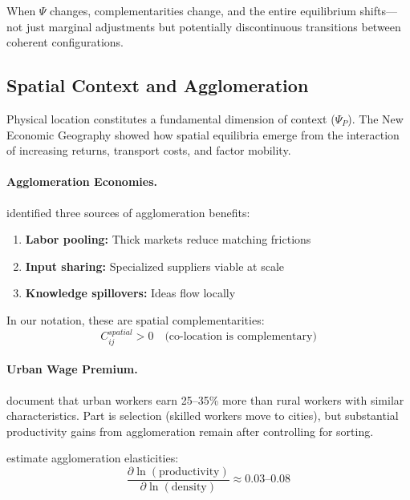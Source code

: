 When $\Psi$ changes, complementarities change, and the entire equilibrium shifts---
not just marginal adjustments but potentially discontinuous transitions between
coherent configurations.


\subsection{Spatial Context and Agglomeration}

Physical location constitutes a fundamental dimension of context ($\Psi_P$).
The New Economic Geography \citep{krugman1991} showed how spatial equilibria
emerge from the interaction of increasing returns, transport costs, and
factor mobility.

\paragraph{Agglomeration Economies.}
\citet{marshall1890} identified three sources of agglomeration benefits:
\begin{enumerate}
  \item \textbf{Labor pooling:} Thick markets reduce matching frictions
  \item \textbf{Input sharing:} Specialized suppliers viable at scale
  \item \textbf{Knowledge spillovers:} Ideas flow locally
\end{enumerate}

In our notation, these are spatial complementarities:
\begin{equation}
  C_{ij}^{spatial} > 0 \quad \text{(co-location is complementary)}
\end{equation}

\paragraph{Urban Wage Premium.}
\citet{glaeser2008,glaeser2009} document that urban workers earn 25--35\% more
than rural workers with similar characteristics. Part is selection (skilled
workers move to cities), but substantial productivity gains from agglomeration
remain after controlling for sorting.

\citet{rosenthal2004,combes2015} estimate agglomeration elasticities:
\begin{equation}
  \frac{\partial \ln(\text{productivity})}{\partial \ln(\text{density})} \approx 0.03\text{--}0.08
\end{equation}


